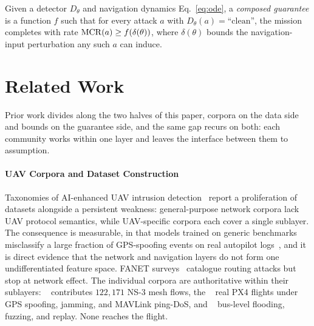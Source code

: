 \begin{definition}
\label{def:composed}
Given a detector $D_\theta$ and navigation dynamics Eq.~\eqref{eq:ode}, a
\emph{composed guarantee} is a function $f$ such that for every attack $a$ with
$D_\theta(a)=\text{``clean''}$, the mission completes with rate
$\mathrm{MCR}(a)\ge f(\delta(\theta))$, where $\delta(\theta)$ bounds the
navigation-input perturbation any such $a$ can induce.
\end{definition}

\section{Related Work}
\label{sec:related}
Prior work divides along the two halves of this paper, corpora on the data side
and bounds on the guarantee side, and the same gap recurs on both: each
community works within one layer and leaves the interface between them to
assumption.

\paragraph{UAV Corpora and Dataset Construction}
Taxonomies of AI-enhanced UAV intrusion detection~\cite{islam2025uavids} report
a proliferation of datasets alongside a persistent weakness: general-purpose
network corpora lack UAV protocol semantics, while UAV-specific corpora each
cover a single sublayer. The consequence is measurable, in that models trained
on generic benchmarks misclassify a large fraction of GPS-spoofing events on
real autopilot logs~\cite{islam2025uavids}, and it is direct evidence that the
network and navigation layers do not form one undifferentiated feature space.
FANET surveys~\cite{tsao2022survey,ceviz2024survey} catalogue routing attacks
but stop at network effect. The individual corpora are authoritative within
their sublayers: ~\cite{uavids2025}
contributes $122{,}171$ NS-3 mesh flows, the ~\cite{whelan2020uav,whelan2020novelty} real PX4 flights under GPS
spoofing, jamming, and MAVLink ping-DoS, and ~\cite{hcrl_uavcan} bus-level flooding, fuzzing, and replay. None reaches
the flight.

